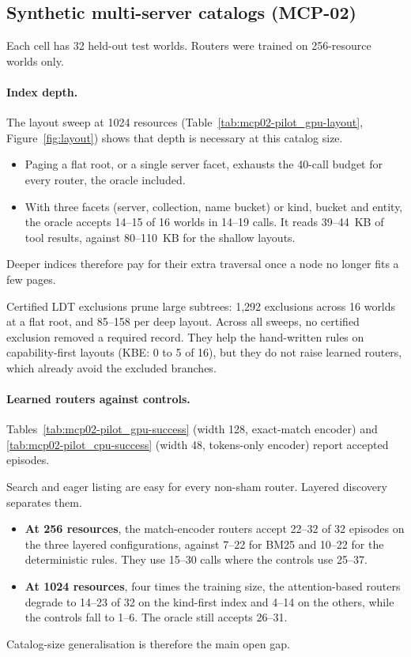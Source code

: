 \subsection{Synthetic multi-server catalogs (MCP-02)}
Each cell has 32 held-out test worlds. Routers were trained on 256-resource worlds only.

\paragraph{Index depth.} The layout sweep at 1024 resources (Table~\ref{tab:mcp02-pilot_gpu-layout},
Figure~\ref{fig:layout}) shows that depth is necessary at this catalog size.
\begin{itemize}
\item Paging a flat root, or a single server facet, exhausts the 40-call budget for every router, the oracle included.
\item With three facets (server, collection, name bucket) or kind, bucket and entity, the oracle accepts 14--15 of 16
worlds in 14--19 calls. It reads 39--44~KB of tool results, against 80--110~KB for the shallow layouts.
\end{itemize}
Deeper indices therefore pay for their extra traversal once a node no longer fits a few pages.

Certified LDT exclusions prune large subtrees: 1,292 exclusions across 16 worlds at a flat root, and 85--158 per
deep layout. Across all sweeps, no certified exclusion removed a required record. They help the hand-written rules
on capability-first layouts (KBE: 0 to 5 of 16), but they do not raise learned routers, which already avoid the
excluded branches.

\paragraph{Learned routers against controls.} Tables~\ref{tab:mcp02-pilot_gpu-success} (width 128, exact-match
encoder) and \ref{tab:mcp02-pilot_cpu-success} (width 48, tokens-only encoder) report accepted episodes.

Search and eager listing are easy for every non-sham router. Layered discovery separates them.
\begin{itemize}
\item \textbf{At 256 resources}, the match-encoder routers accept 22--32 of 32 episodes on the three layered
configurations, against 7--22 for BM25 and 10--22 for the deterministic rules. They use 15--30 calls where the
controls use 25--37.
\item \textbf{At 1024 resources}, four times the training size, the attention-based routers degrade to 14--23 of 32
on the kind-first index and 4--14 on the others, while the controls fall to 1--6. The oracle still accepts 26--31.
\end{itemize}
Catalog-size generalisation is therefore the main open gap.

